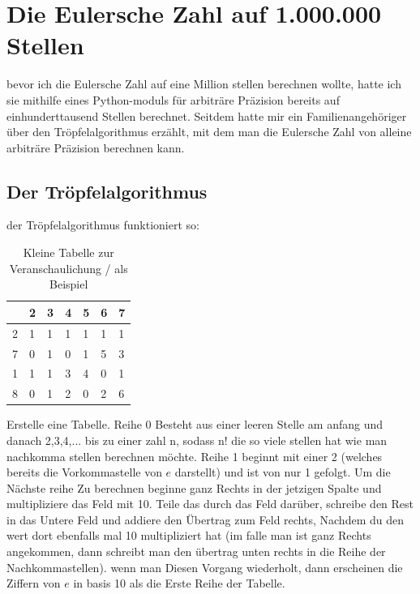 \section{Die Eulersche Zahl auf 1.000.000 Stellen}
bevor ich die Eulersche Zahl auf eine Million stellen berechnen wollte, hatte ich sie mithilfe eines Python-moduls für arbiträre Präzision bereits auf einhunderttausend Stellen berechnet. Seitdem hatte mir ein Familienangehöriger über den Tröpfelalgorithmus erzählt, mit dem man die Eulersche Zahl von alleine arbiträre Präzision berechnen kann.
\subsection{Der Tröpfelalgorithmus}
der Tröpfelalgorithmus funktioniert so:
\begin{table}[h]
\centering
\begin{tabular}{|l|llllll|}
\hline
\rowcolor[HTML]{CBCEFB} 
{\color[HTML]{000000} } & {\color[HTML]{000000} 2} & {\color[HTML]{000000} 3} & {\color[HTML]{000000} 4} & {\color[HTML]{000000} 5} & {\color[HTML]{000000} 6} & {\color[HTML]{000000} 7} \\ \hline
2                       & 1                        & 1                        & 1                        & 1                        & 1                        & 1                        \\
\rowcolor[HTML]{DAE8FC} 
7                       & 0                        & 1                        & 0                        & 1                        & 5                        & 3                        \\
1                       & 1                        & 1                        & 3                        & 4                        & 0                        & 1                        \\
\rowcolor[HTML]{DAE8FC} 
8                       & 0                        & 1                        & 2                        & 0                        & 2                        & 6                        \\ \hline
\end{tabular}
\caption{Kleine Tabelle zur Veranschaulichung / als Beispiel}
\end{table}
\par Erstelle eine Tabelle. Reihe 0 Besteht aus einer leeren Stelle am anfang und danach 2,3,4,... bis zu einer zahl n, sodass n! die so viele stellen hat wie man nachkomma stellen berechnen möchte. Reihe 1 beginnt mit einer 2 (welches bereits die Vorkommastelle von $e$ darstellt) und ist von nur 1 gefolgt. Um die Nächste reihe Zu berechnen beginne ganz Rechts in der jetzigen Spalte und multipliziere das Feld mit 10. Teile das durch das Feld darüber, schreibe den Rest in das Untere Feld und addiere den Übertrag zum Feld rechts, Nachdem du den wert dort ebenfalls mal 10 multipliziert hat (im falle man ist ganz Rechts angekommen, dann schreibt man den übertrag unten rechts in die Reihe der Nachkommastellen). wenn man Diesen Vorgang wiederholt, dann erscheinen die Ziffern von $e$ in basis 10 als die Erste Reihe der Tabelle.
